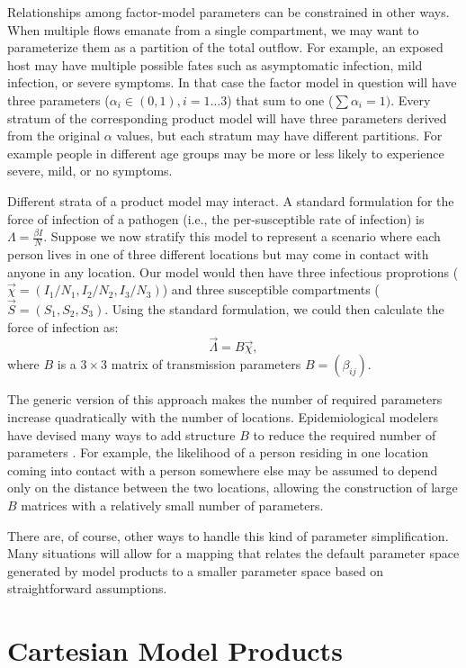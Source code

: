 Relationships among factor-model parameters can be constrained in other ways. When multiple flows emanate from a single compartment, we may want to parameterize them as a partition of the total outflow. For example, an exposed host may have multiple possible fates such as asymptomatic infection, mild infection, or severe symptoms. In that case the factor model in question will have three parameters ($\alpha_i \in (0,1), i = 1 \ldots 3$) that sum to one ($\sum \alpha_i = 1)$. Every stratum of the corresponding product model will have three parameters derived from the original $\alpha$ values,  but each stratum may have different partitions. For example people in different age groups may be more or less likely to experience severe, mild, or no symptoms. 

Different strata of a product model may interact.
A standard formulation for the force of infection of a pathogen (i.e., the per-susceptible rate of infection) is
$\Lambda = \frac{\beta I}{N}$. Suppose we now stratify this model to represent a scenario where each person lives in one of three different locations but may come in contact with anyone in any  location. Our model would then have three infectious proprotions ($\vec{\chi} = (I_1/N_1, I_2/N_2, I_3/N_3)$) and three susceptible compartments ($\vec{S} = (S_1, S_2, S_3)$.
Using the standard formulation, we could then calculate the force of infection as:
$$
    \vec{\Lambda} =  B \vec{\chi}, 
$$
where $B$ is a $3 \times 3$ matrix of transmission parameters $B = \left(\beta_{ij}\right)$.

The generic version of this approach makes the number of required parameters increase quadratically with the number of locations. Epidemiological modelers have devised many ways to add structure $B$ to reduce the required number of parameters \cite{andemay85, andemaybook, grenande85}. 
For example, the likelihood of a person residing in one location coming into contact with a person somewhere else may be assumed to depend only on the distance between the two locations, allowing the construction of large $B$ matrices with a relatively small number of parameters. 

There are, of course, other ways to handle this kind of parameter simplification. Many situations will allow for a mapping that relates the default parameter space generated by model products to a smaller parameter space based on straightforward assumptions.

\section{Cartesian Model Products}\label{worden}

